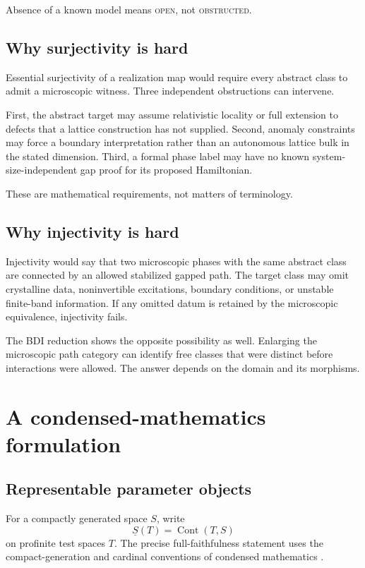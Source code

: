 \documentclass[12pt]{article}
\theoremstyle{definition}
\theoremstyle{remark}
\newcommand{\Cont}{\operatorname{Cont}}
\newcommand{\status}[1]{\textsc{#1}}
\begin{document}
Absence of a known model means \status{open}, not \status{obstructed}.

\subsection{Why surjectivity is hard}

Essential surjectivity of a realization map would require every abstract
class to admit a microscopic witness.
Three independent obstructions can intervene.

First, the abstract target may assume relativistic locality or full
extension to defects that a lattice construction has not supplied.
Second, anomaly constraints may force a boundary interpretation rather than
an autonomous lattice bulk in the stated dimension.
Third, a formal phase label may have no known system-size-independent gap
proof for its proposed Hamiltonian.

These are mathematical requirements, not matters of terminology.

\subsection{Why injectivity is hard}

Injectivity would say that two microscopic phases with the same abstract
class are connected by an allowed stabilized gapped path.
The target class may omit crystalline data, noninvertible excitations,
boundary conditions, or unstable finite-band information.
If any omitted datum is retained by the microscopic equivalence, injectivity
fails.

The BDI reduction shows the opposite possibility as well.
Enlarging the microscopic path category can identify free classes that were
distinct before interactions were allowed.
The answer depends on the domain and its morphisms.

\section{A condensed-mathematics formulation}

\subsection{Representable parameter objects}

For a compactly generated space $S$, write
\[
\underline S(T)=\Cont(T,S)
\]
on profinite test spaces $T$.
The precise full-faithfulness statement uses the compact-generation and
cardinal conventions of condensed mathematics
\cite{Scholze2026}.
\end{document}
